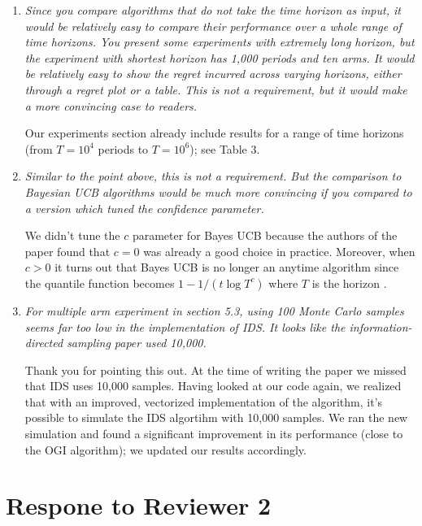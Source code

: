 \documentclass[11pt]{article}
\newcommand{\1}{\ensuremath{\mathbf{1}}} %
\theoremstyle{thm-sf}
\begin{document}
	\begin{enumerate}
		\item {\it Since you compare algorithms that do not take the time horizon as input, it would be relatively easy to compare their performance over a whole range of time horizons. You present some experiments with extremely long horizon, but the experiment with shortest horizon has 1,000 periods and ten arms. It would be relatively easy to show the regret incurred across varying horizons, either through a regret plot or a table. This is not a requirement, but it would make a more convincing case to readers.}
		
		Our experiments section already include results for a range of time horizons (from $T=10^4$ periods to $T = 10^6$); see Table 3. 
		
		\item {\it Similar to the point above, this is not a requirement. But the comparison to Bayesian UCB algorithms would be much more convincing if you compared to a version which tuned the confidence parameter.}
		
		We didn't tune the $c$ parameter for  Bayes UCB because the authors of the paper found that $c=0$ was already a good choice in practice. Moreover, when $c > 0$ it turns out that Bayes UCB is no longer an anytime algorithm since the quantile function becomes $1 - 1/(t\log T^c)$ where $T$ is the horizon \citep{kaufmann2012bayesian}.
		
		\item {\it For multiple arm experiment in section 5.3, using 100 Monte Carlo samples seems far too low in the implementation of IDS. It looks like the information-directed sampling paper used 10,000.}
		
		Thank you for pointing this out. At the time of writing the paper we missed that IDS uses 10,000 samples. Having looked at our code again, we realized that with an improved, vectorized implementation of the algorithm, it's possible to simulate the IDS algortihm with 10,000 samples. We ran the new simulation and found a significant improvement in its performance (close to the OGI algorithm); we updated our results accordingly.
	\end{enumerate}

	\newpage
	\section{Respone to Reviewer 2}
	
\end{document}
